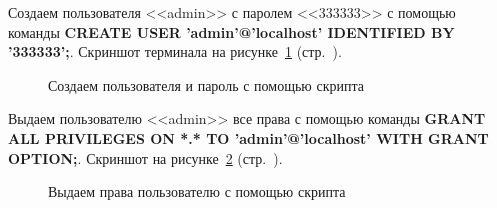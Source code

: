 Создаем пользователя <<admin>> с паролем <<333333>> с помощью команды \textbf{CREATE USER 'admin'@'localhost' IDENTIFIED BY '333333';}. Скриншот терминала на рисунке~\ref{fig:make-phpmyadmin-superuser-step-2} (стр.~\pageref{fig:make-phpmyadmin-superuser-step-2}).

\begin{figure}[!htp]
    \caption{Создаем пользователя и пароль с помощью скрипта}
    \label{fig:make-phpmyadmin-superuser-step-2}
\end{figure}

Выдаем пользователю <<admin>> все права с помощью команды \sloppy \textbf{GRANT ALL PRIVILEGES ON *.* TO 'admin'@'localhost' WITH GRANT OPTION;}. Скриншот на рисунке~\ref{fig:make-phpmyadmin-superuser-step-3} (стр.~\pageref{fig:make-phpmyadmin-superuser-step-3}).

\begin{figure}[!htp]
    \caption{Выдаем права пользователю с помощью скрипта}
    \label{fig:make-phpmyadmin-superuser-step-3}
\end{figure}


